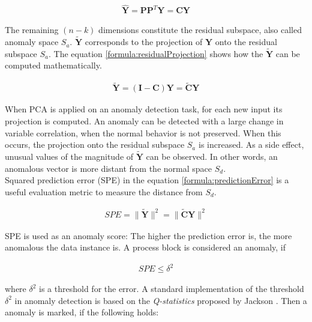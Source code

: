 \begin{gather}
     \mathbf{\hat{Y}} = \mathbf{P}\mathbf{P}^T\mathbf{Y} = \mathbf{CY}
    \label{formula:projection}
\end{gather}

 The remaining $(n - k)$ dimensions constitute the residual subspace, also called anomaly space $S_a$. $\mathbf{\widetilde{Y}}$ corresponds to the projection of $\mathbf{Y}$ onto the residual subspace $S_a$. The equation \ref{formula:residualProjection} shows how the $\mathbf{\widetilde{Y}}$ can be computed mathematically.  
 
\begin{gather}
     \mathbf{\widetilde{Y}} = (\mathbf{I - C})\mathbf{Y} = \mathbf{\widetilde{C}Y}
    \label{formula:residualProjection}
\end{gather}
 
 When PCA is applied on an anomaly detection task, for each new input its projection is computed. An anomaly can be detected with a large change in variable correlation, when the normal behavior is not preserved. When this occurs, the projection onto the residual subspace $S_a$ is increased. As a side effect, unusual values of the magnitude of $\mathbf{\widetilde{Y}}$ can be observed. In other words, an anomalous vector is more distant from the normal space $S_d$.\\
 
 Squared prediction error (SPE) in the equation \ref{formula:predictionError} is a useful evaluation metric to measure the distance from $S_d$. 
 
 \begin{gather}
     SPE = \parallel \mathbf{\widetilde{Y}} \parallel^2  = \parallel \mathbf{\widetilde{C}Y} \parallel^2
    \label{formula:predictionError}
\end{gather}

SPE is used as an anomaly score: The higher the prediction error is, the more anomalous the data instance is. A process block is considered an anomaly, if  

\begin{gather}
     SPE \leq \delta^2
\end{gather}

where $\delta^2$ is a threshold for the error. A standard implementation of the threshold  $\delta^2$ in anomaly detection is based on the \textit{Q-statistics} proposed by Jackson \cite{pcaJackson1979}. Then a anomaly is marked, if the following holds: 

